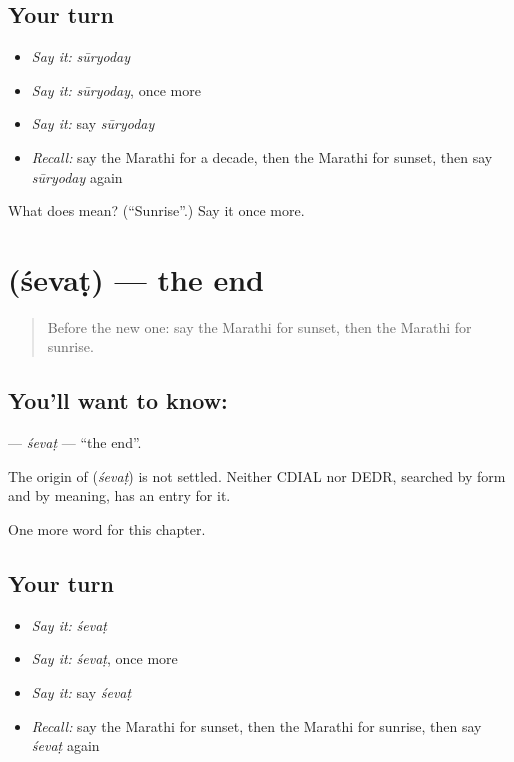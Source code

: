 \subsection*{Your turn}
\begin{itemize}
\raggedright
  \item \emph{Say it:} \emph{sūryoday}
  \item \emph{Say it:} \emph{sūryoday}, once more
  \item \emph{Say it:} say \emph{sūryoday}
  \item \emph{Recall:} say the Marathi for a decade, then the Marathi for sunset, then say \emph{sūryoday} again
\end{itemize}

\begin{tcolorbox}[breakable,colback=teal!4,colframe=teal!35!black,title={Before you move on}]
What does  mean? (\textquotedblleft{}Sunrise\textquotedblright{}.) Say it once more.
\end{tcolorbox}
\section[\texorpdfstring{\mr{शेवट} (śevaṭ)}{शेवट (śevaṭ)}]{ (śevaṭ) — the end}

\label{lesson:MR-C201-sevat}



\begin{quote}
Before the new one: say the Marathi for sunset, then the Marathi for sunrise.
\end{quote}

\subsection*{You'll want to know: }
\textbf{} — \emph{śevaṭ} — \textquotedblleft{}the end\textquotedblright{}.

\begin{cousinweb}
The origin of \textbf{} (\emph{śevaṭ}) is not settled. Neither CDIAL nor DEDR, searched by form and by meaning, has an entry for it.
\end{cousinweb}

\begin{grammarlens}[title={What you've built}]
One more word for this chapter.
\end{grammarlens}

\subsection*{Your turn}
\begin{itemize}
\raggedright
  \item \emph{Say it:} \emph{śevaṭ}
  \item \emph{Say it:} \emph{śevaṭ}, once more
  \item \emph{Say it:} say \emph{śevaṭ}
  \item \emph{Recall:} say the Marathi for sunset, then the Marathi for sunrise, then say \emph{śevaṭ} again
\end{itemize}

